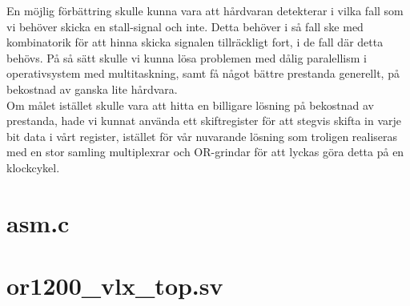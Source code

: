 \documentclass[a4paper]{article}
\begin{document}
En möjlig förbättring skulle kunna vara att hårdvaran detekterar i vilka
fall som vi behöver skicka en stall-signal och inte. Detta behöver i så
fall ske med kombinatorik för att hinna skicka signalen tillräckligt
fort, i de fall där detta behövs. På så sätt skulle vi kunna lösa
problemen med dålig paralellism i operativsystem med multitaskning, samt
få något bättre prestanda generellt, på bekostnad av ganska lite
hårdvara.\\

Om målet istället skulle vara att hitta en billigare lösning på
bekostnad av prestanda, hade vi kunnat använda ett skiftregister för att
stegvis skifta in varje bit data i vårt register, istället för vår
nuvarande lösning som troligen realiseras med en stor samling
multiplexrar och OR-grindar för att lyckas göra detta på en
klockcykel.\\

\newpage
\begin{appendices}
\begin{changemargin}{-3cm}{-3cm}

\section{asm.c}


\section{or1200\_vlx\_top.sv}


\end{changemargin}
\end{appendices}
\end{document}
